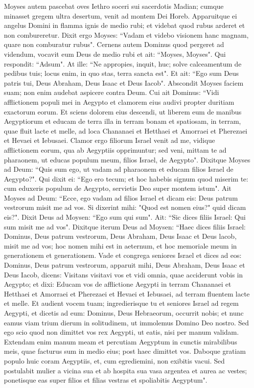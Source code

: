 \begin{biblechapter}  
\verse Moyses autem pascebat oves Iethro soceri sui sacerdotis Madian; cumque minasset gregem ultra desertum, venit ad montem Dei Horeb. 
\verse Apparuitque ei angelus Domini in flamma ignis de medio rubi; et videbat quod rubus arderet et non combureretur. 
\verse Dixit ergo Moyses: “Vadam et videbo visionem hanc magnam, quare non comburatur rubus". 
\verse Cernens autem Dominus quod pergeret ad videndum, vocavit eum Deus de medio rubi et ait: “Moyses, Moyses". Qui respondit: “Adsum". 
\verse At ille: “Ne appropies, inquit, huc; solve calceamentum de pedibus tuis; locus enim, in quo stas, terra sancta est". 
\verse Et ait: “Ego sum Deus patris tui, Deus Abraham, Deus Isaac et Deus Iacob". Abscondit Moyses faciem suam; non enim audebat aspicere contra Deum. 
\verse Cui ait Dominus: “Vidi afflictionem populi mei in Aegypto et clamorem eius audivi propter duritiam exactorum eorum. 
\verse Et sciens dolorem eius descendi, ut liberem eum de manibus Aegyptiorum et educam de terra illa in terram bonam et spatiosam, in terram, quae fluit lacte et melle, ad loca Chananaei et Hetthaei et Amorraei et Pherezaei et Hevaei et Iebusaei. 
\verse Clamor ergo filiorum Israel venit ad me, vidique afflictionem eorum, qua ab Aegyptiis opprimuntur;  
\verse sed veni, mittam te ad pharaonem, ut educas populum meum, filios Israel, de Aegypto". 
\verse Dixitque Moyses ad Deum: “Quis sum ego, ut vadam ad pharaonem et educam filios Israel de Aegypto?". 
\verse Qui dixit ei: “Ego ero tecum; et hoc habebis signum quod miserim te: cum eduxeris populum de Aegypto, servietis Deo super montem istum". 
\verse Ait Moyses ad Deum: “Ecce, ego vadam ad filios Israel et dicam eis: Deus patrum vestrorum misit me ad vos. Si dixerint mihi: "Quod est nomen eius?" quid dicam eis?". 
\verse Dixit Deus ad Moysen: “Ego sum qui sum". Ait: “Sic dices filiis Israel: Qui sum misit me ad vos". 
\verse Dixitque iterum Deus ad Moysen: “Haec dices filiis Israel: Dominus, Deus patrum vestrorum, Deus Abraham, Deus Isaac et Deus lacob, misit me ad vos; hoc nomen mihi est in aeternum, et hoc memoriale meum in generationem et generationem. 
\verse Vade et congrega seniores Israel et dices ad eos: Dominus, Deus patrum vestrorum, apparuit mihi, Deus Abraham, Deus Isaac et Deus Iacob, dicens: Visitans visitavi vos et vidi omnia, quae acciderunt vobis in Aegypto; 
\verse et dixi: Educam vos de afflictione Aegypti in terram Chananaei et Hetthaei et Amorraei et Pherezaei et Hevaei et Iebusaei, ad terram fluentem lacte et melle. 
\verse Et audient vocem tuam; ingredierisque tu et seniores Israel ad regem Aegypti, et dicetis ad eum: Dominus, Deus Hebraeorum, occurrit nobis; et nunc eamus viam trium dierum in solitudinem, ut immolemus Domino Deo nostro. 
\verse Sed ego scio quod non dimittet vos rex Aegypti, ut eatis, nisi per manum validam. 
\verse Extendam enim manum meam et percutiam Aegyptum in cunctis mirabilibus meis, quae facturus sum in medio eius; post haec dimittet vos.  
\verse Daboque gratiam populo huic coram Aegyptiis, et, cum egrediemini, non exibitis vacui. 
\verse Sed postulabit mulier a vicina sua et ab hospita sua vasa argentea et aurea ac vestes; ponetisque eas super filios et filias vestras et spoliabitis Aegyptum". 
\end{biblechapter}

